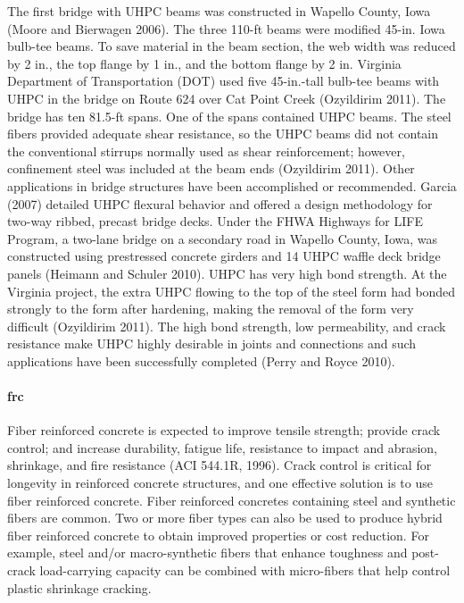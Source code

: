 The first bridge with UHPC beams was constructed in Wapello County, Iowa (Moore and Bierwagen 2006). The three 110-ft beams were modified 45-in. Iowa bulb-tee beams. To save material in the beam section, the web width was reduced by 2 in., the top flange by 1 in., and the bottom flange by 2 in. Virginia Department of Transportation (DOT) used five 45-in.-tall bulb-tee beams with UHPC in the bridge on Route 624 over Cat Point Creek (Ozyildirim 2011). The bridge has ten 81.5-ft spans. One of the spans contained UHPC beams. The steel fibers provided adequate shear resistance, so the UHPC beams did not contain the conventional stirrups normally used as shear reinforcement; however, confinement steel was included at the beam ends (Ozyildirim 2011). Other applications in bridge structures have been accomplished or recommended. Garcia (2007) detailed UHPC flexural behavior and offered a design methodology for two-way ribbed, precast bridge decks. Under the FHWA Highways for LIFE Program, a two-lane bridge on a secondary road in Wapello County, Iowa, was constructed using prestressed concrete girders and 14 UHPC waffle deck bridge panels (Heimann and Schuler 2010). UHPC has very high bond strength. At the Virginia project, the extra UHPC flowing to the top of the steel form had bonded strongly to the form after hardening, making the removal of the form very difficult (Ozyildirim 2011). The high bond strength, low permeability, and crack resistance make UHPC highly desirable in joints and connections and such applications have been successfully completed (Perry and Royce 2010).

\paragraph{\acrfull*{frc}}
Fiber reinforced concrete is expected to improve tensile strength; provide crack control; and increase durability, fatigue life, resistance to impact and abrasion, shrinkage, and fire resistance (ACI 544.1R, 1996). Crack control is critical for longevity in reinforced concrete structures, and one effective solution is to use fiber reinforced concrete.  Fiber reinforced concretes containing steel and synthetic fibers are common. Two or more fiber types can also be used to produce hybrid fiber reinforced concrete to obtain improved properties or cost reduction. For example, steel and/or macro-synthetic fibers that enhance toughness and post-crack load-carrying capacity can be combined with micro-fibers that help control plastic shrinkage cracking.

